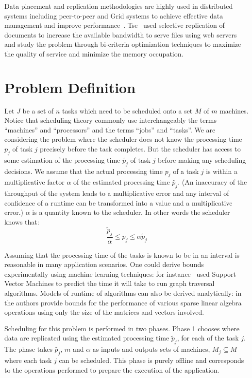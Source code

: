 \documentclass[twocolumn]{svjour3}
\begin{document}
Data placement and replication methodologies are highly used in
distributed systems including peer-to-peer and Grid systems to achieve
effective data management and improve
performance~\cite{Cirne2007213,Abawajy,4215379}. Tse~\cite{DBLP:journals/tc/Tse12}
used selective replication of documents to increase the available
bandwidth to serve files using web servers and study the problem
through bi-criteria optimization techniques to maximize the quality of
service and minimize the memory occupation.


\section{Problem Definition}\label{sec2}
Let $J$ be a set of $n$ tasks which need to be scheduled onto a set $M$
of $m$ machines. Notice that scheduling theory commonly use interchangeably the terms ``machines'' and
``processors'' and the terms ``jobs'' and
``tasks''. We are considering the problem where the scheduler does not
know the processing time $p_j$ of task $j$ precisely before the task
completes.  But the scheduler has access to some estimation of the
processing time $\tilde{p_j}$ of task $j$ before making any scheduling
decisions. We assume that the actual processing time $p_j$ of a task
$j$ is within a multiplicative factor $\alpha$ of the estimated
processing time $\tilde{p_j}$. (An inaccuracy of the throughput of the system leads to a multiplicative error and any interval of confidence of a runtime can be transformed into a value and a multiplicative error.) $\alpha$ is a quantity known to the
scheduler. In other words the scheduler knows that:
 \begin{equation}\label{eq1}
\frac{\tilde{p}_{j}}{\alpha}\leq p_{j}\leq \alpha \tilde{p}_{j}
\end{equation}

Assuming that the processing time of the tasks is known to be in an
interval is reasonable in many application scenarios. One could derive
bounds experimentally using machine learning techniques: for
instance~\cite{You14-ICPP} used Support Vector Machines to predict the time it
will take to run graph traversal algorithms. Models of runtime of
algorithms can also be derived analytically:
in~\cite{Erlebacher14-ICS} the authors provide bounds for the
performance of various sparse linear algebra operations using only the
size of the matrices and vectors involved.


Scheduling for this problem is performed in two phases. Phase 1
chooses where data are replicated using the estimated processing time
$\tilde p_j $, for each of the task $j$. The phase takes
$\tilde{p_j}$, $m$ and $\alpha$ as inputs and outputs sets of machines,
$M_j \subseteq M $ where each task $j$ can be scheduled. This phase is
purely offline and corresponds to the operations performed to prepare
the execution of the application.
\end{document}
